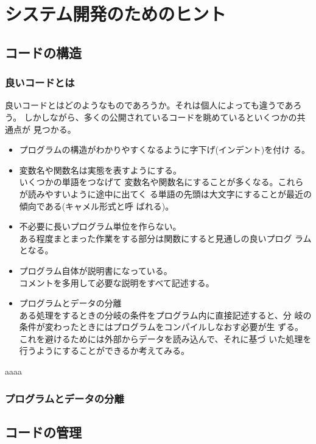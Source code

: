 \chapter{システム開発のためのヒント}
\section{コードの構造}
\subsection{良いコードとは}
良いコードとはどのようなものであろうか。それは個人によっても違うであろう。
しかしながら、多くの公開されているコードを眺めているといくつかの共通点が
見つかる。
\begin{itemize}
 \item プログラムの構造がわかりやすくなるように字下げ(インデント)を付け
			 る。
 \item 変数名や関数名は実態を表すようにする。\\いくつかの単語をつなげて
			 変数名や関数名にすることが多くなる。これらが読みやすいように途中に出てく
			 る単語の先頭は大文字にすることが最近の傾向である(キャメル形式と呼
			 ばれる)。
 \item 不必要に長いプログラム単位を作らない。\\
			 ある程度まとまった作業をする部分は関数にすると見通しの良いプログ
			 ラムとなる。
 \item プログラム自体が説明書になっている。\\
			 コメントを多用して必要な説明をすべて記述する。
 \item プログラムとデータの分離\\
			 ある処理をするときの分岐の条件をプログラム内に直接記述すると、分
			 岐の条件が変わったときにはプログラムをコンパイルしなおす必要が生
			 ずる。これを避けるためには外部からデータを読み込んで、それに基づ
			 いた処理を行うようにすることができるか考えてみる。
\end{itemize}aaaa
\subsection{プログラムとデータの分離}
\begin{Exec}
 
\end{Exec}
\section{コードの管理}
